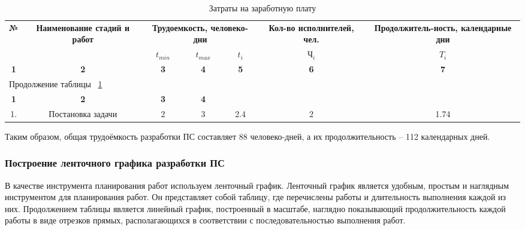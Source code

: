 \begin{center}
\begin{longtable}{|c|c|c|c|c|c|c|}
\caption{Затраты на заработную плату} \label{tab:eco2} \\ \hline
\multicolumn{1}{|c|}{\textbf{№}} & \multicolumn{1}{p{3.2cm}|}{\textbf{Наименование стадий и  работ}} & 
\multicolumn{3}{p{3.5cm}|}{\textbf{Трудоемкость, человеко-дни}} &   \multicolumn{1}{p{3cm}|}{\textbf{Кол-во исполнителей, чел.}} &
\multicolumn{1}{p{3.8cm}|}{\textbf{Продолжитель-ность, календарные дни}} \\
\cline{3-7}

\multicolumn{1}{|c|}{} &   \multicolumn{1}{c|}{} & 
\multicolumn{1}{|c|}{${t_{min}}$} & \multicolumn{1}{c|}{${t_{max}}$} & 
\multicolumn{1}{|c|}{ ${t_i}$ } &   \multicolumn{1}{c|}{ ${\mbox{Ч}_i}$ } & 
\multicolumn{1}{c|}{ ${T_i}$ } \\ \hline

\multicolumn{1}{|c|}{\textbf{1}} &   \multicolumn{1}{c|}{\textbf{2}} & 
\multicolumn{1}{|c|}{\textbf{3}} &   \multicolumn{1}{c|}{\textbf{4}} & 
\multicolumn{1}{|c|}{\textbf{5}} &   \multicolumn{1}{c|}{\textbf{6}} & 
\multicolumn{1}{c|}{\textbf{7}} \\ \hline
\endfirsthead

\multicolumn{7}{|l|}{{Продолжение таблицы ~\ref{tab:eco2}}} \\ %
\hline
\multicolumn{1}{|c|}{\textbf{1}} &   \multicolumn{1}{c|}{\textbf{2}} & 
\multicolumn{1}{c|}{\textbf{3}} & \multicolumn{1}{c|}{\textbf{4}} \\ \hline
\endhead

\endfoot

\hline
\endlastfoot

1. & Постановка задачи & 2 & 3 & 2.4 & 2 & 1.74 \\ \hline

\hline

\end{longtable}
\end{center}

Таким образом, общая трудоёмкость разработки ПС составляет  88 человеко-дней, а их продолжительность – 112 календарных дней.

\subsubsection*{Построение ленточного графика разработки ПС}
В качестве инструмента планирования работ используем ленточный график. Ленточный график является удобным, простым и наглядным
инструментом для планирования работ. Он представляет собой таблицу, где перечислены  работы и длительность выполнения каждой
из них. Продолжением таблицы является линейный график, построенный в масштабе, наглядно показывающий продолжительность
каждой работы в виде отрезков прямых,  располагающихся в соответствии с последовательностью выполнения работ.

